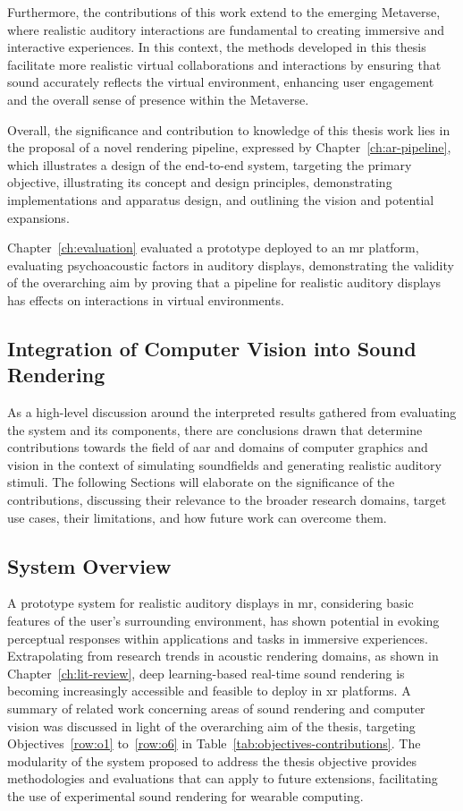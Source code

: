 Furthermore, the contributions of this work extend to the emerging Metaverse, where realistic auditory interactions are fundamental to creating immersive and interactive experiences. In this context, the methods developed in this thesis facilitate more realistic virtual collaborations and interactions by ensuring that sound accurately reflects the virtual environment, enhancing user engagement and the overall sense of presence within the Metaverse.\par
Overall, the significance and contribution to knowledge of this thesis work lies in the proposal of a novel rendering pipeline, expressed by Chapter~\ref{ch:ar-pipeline}, which illustrates a design of the end-to-end system, targeting the primary objective, illustrating its concept and design principles, demonstrating implementations and apparatus design, and outlining the vision and potential expansions.\par
Chapter~\ref{ch:evaluation} evaluated a prototype deployed to an \acrshort{mr} platform, evaluating psychoacoustic factors in auditory displays, demonstrating the validity of the overarching aim by proving that a pipeline for realistic auditory displays has effects on interactions in virtual environments.\par

\subsection{Integration of Computer Vision into Sound Rendering}
As a high-level discussion around the interpreted results gathered from evaluating the system and its components, there are conclusions drawn that determine contributions towards the field of \acrfull{aar} and domains of computer graphics and vision in the context of simulating soundfields and generating realistic auditory stimuli. The following Sections will elaborate on the significance of the contributions, discussing their relevance to the broader research domains, target use cases, their limitations, and how future work can overcome them.

\subsection{System Overview}
A prototype system for realistic auditory displays in \acrshort{mr}, considering basic features of the user's surrounding environment, has shown potential in evoking perceptual responses within applications and tasks in immersive experiences. Extrapolating from research trends in acoustic rendering domains, as shown in Chapter~\ref{ch:lit-review}, deep learning-based real-time sound rendering is becoming increasingly accessible and feasible to deploy in \acrshort{xr} platforms. A summary of related work concerning areas of sound rendering and computer vision was discussed in light of the overarching aim of the thesis, targeting Objectives~\ref{row:o1} to~\ref{row:o6} in Table~\ref{tab:objectives-contributions}.
The modularity of the system proposed to address the thesis objective provides methodologies and evaluations that can apply to future extensions, facilitating the use of experimental sound rendering for wearable computing.

